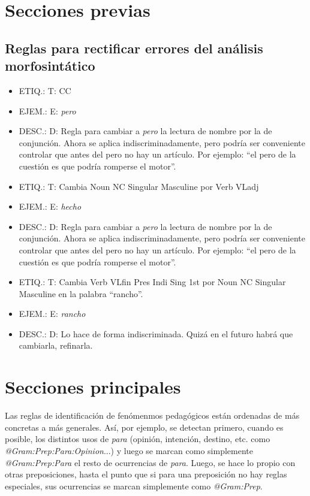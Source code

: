 \documentclass[11pt]{report}
\begin{document}
\part{Secciones previas}
\chapter{Reglas para rectificar errores del análisis morfosintático}
\begin{itemize}
\item ETIQ.:  T: CC
\item EJEM.:  E: \emph{pero} 
\item DESC.:  D: Regla para cambiar a \emph{pero} la lectura de nombre por la de conjunción. Ahora se aplica indiscriminadamente, pero podría ser conveniente controlar que antes del pero no hay un artículo. Por ejemplo: ``el pero de la cuestión es que podría romperse el motor''.
\end{itemize}

\begin{itemize}
\item ETIQ.:  T: Cambia Noun NC Singular Masculine por Verb VLadj
\item EJEM.:  E: \emph{hecho} 
\item DESC.:  D: Regla para cambiar a \emph{pero} la lectura de nombre por la de conjunción. Ahora se aplica indiscriminadamente, pero podría ser conveniente controlar que antes del pero no hay un artículo. Por ejemplo: ``el pero de la cuestión es que podría romperse el motor''.
\end{itemize}

\begin{itemize}
\item ETIQ.:  T: Cambia Verb VLfin Pres Indi Sing 1st por Noun NC Singular Masculine en la palabra ``rancho''.
\item EJEM.:  E: \emph{rancho} 
\item DESC.:  D: Lo hace de forma indiscriminada. Quizá en el futuro habrá que cambiarla, refinarla.
\end{itemize}

\part{Secciones principales}
Las reglas de identificación de fenómenmos pedagógicos están ordenadas de más concretas a más generales. Así, por ejemplo, se detectan primero, cuando es posible, los distintos usos de \emph{para} (opinión, intención, destino, etc. como \emph{@Gram:Prep:Para:Opinion}...) y luego se marcan como simplemente \emph{@Gram:Prep:Para} el resto de ocurrencias de \emph{para}. Luego, se hace lo propio con otras preposiciones, hasta el punto que si para una preposición no hay reglas especiales, sus ocurrencias se marcan simplemente como \emph{@Gram:Prep}.
\end{document}
